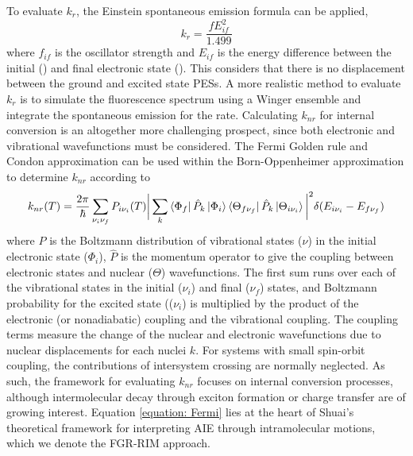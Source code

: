 To evaluate $k_{r}$, the Einstein spontaneous emission formula can be applied,
\begin{equation}
    k_{r}=\frac{fE_{if}^{2}}{1.499}
\end{equation}
where $f_{if}$ is the oscillator strength and $E_{if}$ is the energy difference between the initial (\sone{}) and final electronic state (\szero{}). This considers that there is no displacement between the ground and excited state \acp{PES}. A more realistic method to evaluate $k_{r}$ is to simulate the fluorescence spectrum using a Winger ensemble and integrate the spontaneous emission for the rate.\cite{Crespo-Otero2012} Calculating $k_{nr}$ for internal conversion is an altogether more challenging prospect, since both electronic and vibrational wavefunctions must be considered. The Fermi Golden rule and Condon approximation can be used within the Born-Oppenheimer approximation to determine $k_{nr}$ according to
\begin{equation}\label{equation: Fermi}
    k_{nr}(T)=\frac{2\pi}{\hbar}\sum_{\nu_{i}\nu_{f}}P_{i\nu_{i}}(T)\bigg|\sum_{k}\bra{\Phi_{f}}\hat{P}_{k}\ket{\Phi_{i}}\bra{\Theta_{f\nu_{f}}}\hat{P}_{k}\ket{\Theta_{i\nu_{i}}}\bigg|^{2}\delta{}(E_{i\nu_{i}}-E_{f\nu_{f}})
\end{equation}
where $P$ is the Boltzmann distribution of vibrational states ($\nu$) in the initial electronic state ($\Phi_{i}$), $\hat{P}$ is the momentum operator to give the coupling between electronic states and nuclear ($\Theta$) wavefunctions. The first sum runs over each of the vibrational states in the initial ($\nu_{i}$) and final ($\nu_{f}$)  states, and Boltzmann probability for the excited state (($\nu_{i}$) is multiplied by the product of the electronic (or nonadiabatic) coupling and the vibrational coupling. The coupling terms measure the change of the nuclear and electronic wavefunctions due to nuclear displacements for each nuclei $k$. For systems with small spin-orbit coupling, the contributions of intersystem crossing are normally neglected. As such, the framework for evaluating $k_{nr}$ focuses on internal conversion processes, although intermolecular decay through exciton formation or charge transfer are of growing interest.\cite{Li2017} Equation \ref{equation: Fermi} lies at the heart of Shuai's theoretical framework for interpreting AIE through intramolecular motions, which we denote the \ac{FGR-RIM} approach.

